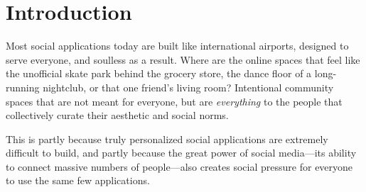 \section{Introduction}

Most social applications today are built like international airports,
designed to serve everyone, and soulless as a result.
Where are the online spaces that feel like
the unofficial skate park behind the grocery store,
the dance floor of a long-running nightclub,
or that one friend's living room?
Intentional community spaces that are not meant for everyone,
but are \emph{everything} to the people
that collectively curate their aesthetic and social norms.

This is partly because truly personalized social
applications are extremely difficult to build,
and partly because the great power of social media---its
ability to connect massive numbers of people---also
creates social pressure for everyone to use the same few applications.








